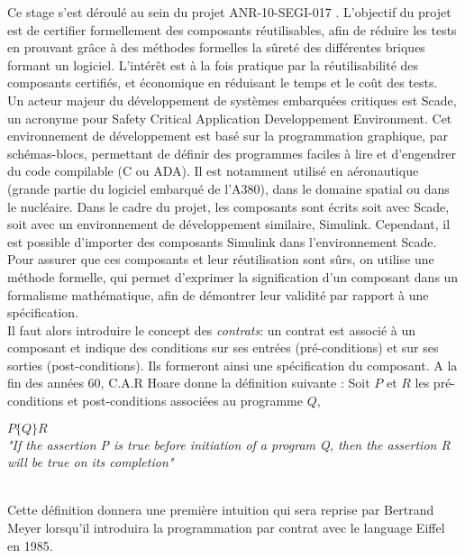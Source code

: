 


Ce stage s'est déroulé au sein du projet ANR-10-SEGI-017 \cercles\cite{Cercles}.
L'objectif du projet est de certifier formellement
des composants réutilisables, afin de réduire les tests en prouvant
grâce à des méthodes formelles la sûreté des différentes briques formant un
logiciel. L'intérêt est à la fois pratique par la réutilisabilité des composants
certifiés, et économique en réduisant le temps et le coût des tests. \\  

Un acteur majeur du développement de systèmes embarquées critiques est Scade,
un acronyme pour Safety Critical Application Developpement Environment. Cet
environnement de développement est basé sur la programmation graphique, par
schémas-blocs, permettant de définir des programmes faciles à lire et
d'engendrer du code compilable (C ou ADA). Il est 
notamment utilisé en aéronautique (grande partie du logiciel embarqué de
l'A380), dans le domaine spatial ou dans le nucléaire. Dans le cadre du projet,
les composants sont écrits soit avec Scade, soit avec un environnement de
développement similaire, Simulink. Cependant, il est possible d'importer des
composants Simulink dans l'environnement Scade. \\


Pour assurer que ces composants et leur réutilisation sont sûrs, on
utilise une méthode formelle, qui permet d'exprimer la signification d'un
composant dans un formalisme mathématique, afin de démontrer leur
validité par rapport à une spécification.\\
Il faut alors introduire le concept des \emph{contrats}: un contrat est
associé à un composant et indique des conditions sur ses entrées
(pré-conditions) et sur ses sorties (post-conditions). Ils formeront
ainsi une spécification du composant. 
A la fin des années 60, C.A.R Hoare donne la définition suivante \cite{Hoare} : Soit $P$ et
$R$ les pré-conditions et post-conditions associées au programme $Q$, \\
\begin{minipage}{\textwidth}
\begin{center}
$P\{Q\}R$ \\
\emph{"If the assertion P is true before initiation of a program Q, then the
assertion R will be true on its completion"}
\end{center}
\end{minipage}
\\
Cette définition donnera une première intuition qui sera reprise par Bertrand
Meyer lorsqu'il introduira la programmation par contrat avec le language Eiffel
en 1985.\\

